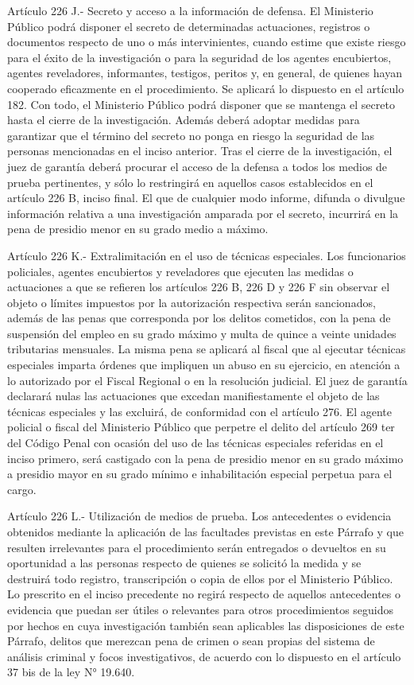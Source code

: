     Artículo 226 J.- Secreto y acceso a la información de defensa. El Ministerio Público podrá disponer el secreto de determinadas actuaciones, registros o documentos respecto de uno o más intervinientes, cuando estime que existe riesgo para el éxito de la investigación o para la seguridad de los agentes encubiertos, agentes reveladores, informantes, testigos, peritos y, en general, de quienes hayan cooperado eficazmente en el procedimiento.
    Se aplicará lo dispuesto en el artículo 182. Con todo, el Ministerio Público podrá disponer que se mantenga el secreto hasta el cierre de la investigación. Además deberá adoptar medidas para garantizar que el término del secreto no ponga en riesgo la seguridad de las personas mencionadas en el inciso anterior.
    Tras el cierre de la investigación, el juez de garantía deberá procurar el acceso de la defensa a todos los medios de prueba pertinentes, y sólo lo restringirá en aquellos casos establecidos en el artículo 226 B, inciso final.
    El que de cualquier modo informe, difunda o divulgue información relativa a una investigación amparada por el secreto, incurrirá en la pena de presidio menor en su grado medio a máximo.

    Artículo 226 K.- Extralimitación en el uso de técnicas especiales. Los funcionarios policiales, agentes encubiertos y reveladores que ejecuten las medidas o actuaciones a que se refieren los artículos 226 B, 226 D y 226 F sin observar el objeto o límites impuestos por la autorización respectiva serán sancionados, además de las penas que corresponda por los delitos cometidos, con la pena de suspensión del empleo en su grado máximo y multa de quince a veinte unidades tributarias mensuales.
    La misma pena se aplicará al fiscal que al ejecutar técnicas especiales imparta órdenes que impliquen un abuso en su ejercicio, en atención a lo autorizado por el Fiscal Regional o en la resolución judicial.
    El juez de garantía declarará nulas las actuaciones que excedan manifiestamente el objeto de las técnicas especiales y las excluirá, de conformidad con el artículo 276.
    El agente policial o fiscal del Ministerio Público que perpetre el delito del artículo 269 ter del Código Penal con ocasión del uso de las técnicas especiales referidas en el inciso primero, será castigado con la pena de presidio menor en su grado máximo a presidio mayor en su grado mínimo e inhabilitación especial perpetua para el cargo.

    Artículo 226 L.- Utilización de medios de prueba. Los antecedentes o evidencia obtenidos mediante la aplicación de las facultades previstas en este Párrafo y que resulten irrelevantes para el procedimiento serán entregados o devueltos en su oportunidad a las personas respecto de quienes se solicitó la medida y se destruirá todo registro, transcripción o copia de ellos por el Ministerio Público.
    Lo prescrito en el inciso precedente no regirá respecto de aquellos antecedentes o evidencia que puedan ser útiles o relevantes para otros procedimientos seguidos por hechos en cuya investigación también sean aplicables las disposiciones de este Párrafo, delitos que merezcan pena de crimen o sean propias del sistema de análisis criminal y focos investigativos, de acuerdo con lo dispuesto en el artículo 37 bis de la ley N° 19.640.

